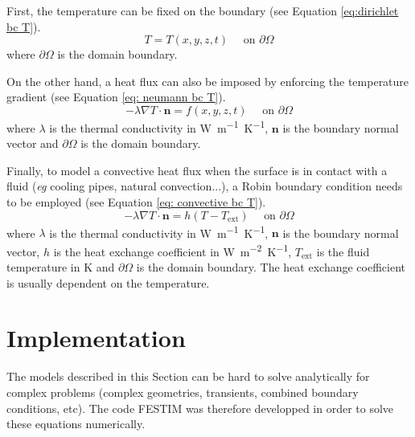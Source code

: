 First, the temperature can be fixed on the boundary (see Equation \ref{eq:dirichlet bc T}).
\begin{equation}
    T = T(x, y, z, t) \quad \text { on } \partial \Omega
    \label{eq:dirichlet bc T}
\end{equation}
where $\partial \Omega$ is the domain boundary.

On the other hand, a heat flux can also be imposed by enforcing the temperature gradient (see Equation \ref{eq: neumann bc T}).
\begin{equation}
    -\lambda \nabla T \cdot \mathbf{n} = f(x, y, z, t) \quad \text { on } \partial \Omega
    \label{eq: neumann bc T}
\end{equation}
where $\lambda$ is the thermal conductivity in \si{W.m^{-1}.K^{-1}}, $\mathbf{n}$ is the boundary normal vector and $\partial \Omega$ is the domain boundary.

Finally, to model a convective heat flux when the surface is in contact with a fluid (\textit{eg} cooling pipes, natural convection...), a Robin boundary condition needs to be employed (see Equation \ref{eq: convective bc T}).
\begin{equation}
    -\lambda \nabla T \cdot \mathbf{n} = h (T - T_\mathrm{ext}) \quad \text { on } \partial \Omega
    \label{eq: convective bc T}
\end{equation}
where $\lambda$ is the thermal conductivity in \si{W.m^{-1}.K^{-1}}, $\mathbf{n}$ is the boundary normal vector, $h$ is the heat exchange coefficient in \si{W.m^{-2}.K^{-1}}, $T_\mathrm{ext}$ is the fluid temperature in \si{K} and $\partial \Omega$ is the domain boundary.
The heat exchange coefficient is usually dependent on the temperature.

\section{Implementation}


The models described in this Section can be hard to solve analytically for complex problems (complex geometries, transients, combined boundary conditions, etc).
The code FESTIM  was therefore developped in order to solve these equations numerically.


